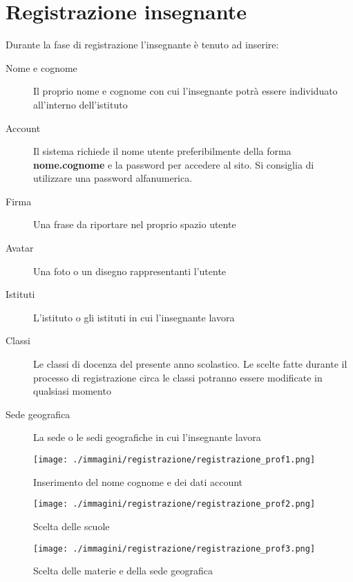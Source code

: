 \section{Registrazione insegnante}

Durante la fase di registrazione l'insegnante è tenuto ad inserire:
\begin{description}
 \item[Nome e cognome] Il proprio nome e cognome con cui l'insegnante potrà essere individuato all'interno dell'istituto
\item[Account] Il sistema richiede il nome utente preferibilmente della forma \textbf{nome.cognome} e la password per accedere al sito. Si consiglia di utilizzare una password alfanumerica.
\item[Firma] Una frase da riportare nel proprio spazio utente
\item[Avatar] Una foto o un disegno rappresentanti l'utente
\item[Istituti] L'istituto o gli istituti in cui l'insegnante lavora
\item[Classi] Le classi di docenza del presente anno scolastico. Le scelte fatte durante il processo di registrazione circa le classi potranno essere modificate in qualsiasi momento
\item[Sede geografica] La sede o le sedi geografiche in cui l'insegnante lavora 
\end{description}

\begin{figure}[H]
 \centering
 \texttt{[image: ./immagini/registrazione/registrazione\_prof1.png]}
 \caption{Inserimento del nome cognome e dei dati account}
 \label{fig:reg_prof1}
\end{figure}
\begin{figure}[H]
 \centering
 \texttt{[image: ./immagini/registrazione/registrazione\_prof2.png]}
 \caption{Scelta delle scuole}
 \label{fig:reg_prof2}
\end{figure}


\begin{figure}[H]
 \centering
 \texttt{[image: ./immagini/registrazione/registrazione\_prof3.png]}
 \caption{Scelta delle materie e della sede geografica}
 \label{fig:reg_prof3}
\end{figure}
